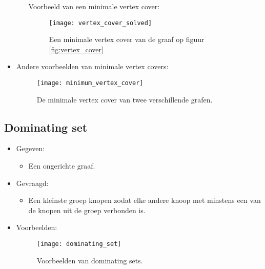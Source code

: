 \begin{itemize}
\begin{itemize}
        Voorbeeld van een minimale vertex cover:
        \begin{figure}[ht]
            \centering
            \texttt{[image: vertex\_cover\_solved]}
            \caption{Een minimale vertex cover van de graaf op figuur \ref{fig:vertex_cover}}
            \label{fig:vertex_cover_solved}
        \end{figure}
    \end{itemize}
    \item Andere voorbeelden van minimale vertex covers:
    \begin{figure}[ht]
        \centering
        \texttt{[image: minimum\_vertex\_cover]}
        \caption{De minimale vertex cover van twee verschillende grafen.}
        \label{fig:minimum_vertex_cover}
    \end{figure}
\end{itemize}

\subsection{Dominating set}
\begin{itemize}
    \item Gegeven:
    \begin{itemize}
        \item Een ongerichte graaf.
    \end{itemize}
    \item Gevraagd:
    \begin{itemize}
        \item Een kleinste groep knopen zodat elke andere knoop met minstens een van de knopen uit de groep verbonden is.
    \end{itemize}
    \item Voorbeelden:
    \begin{figure}[ht]
        \centering
        \texttt{[image: dominating\_set]}
        \caption{Voorbeelden van dominating sets.}
        \label{fig:dominating_set}
    \end{figure}
\end{itemize}

